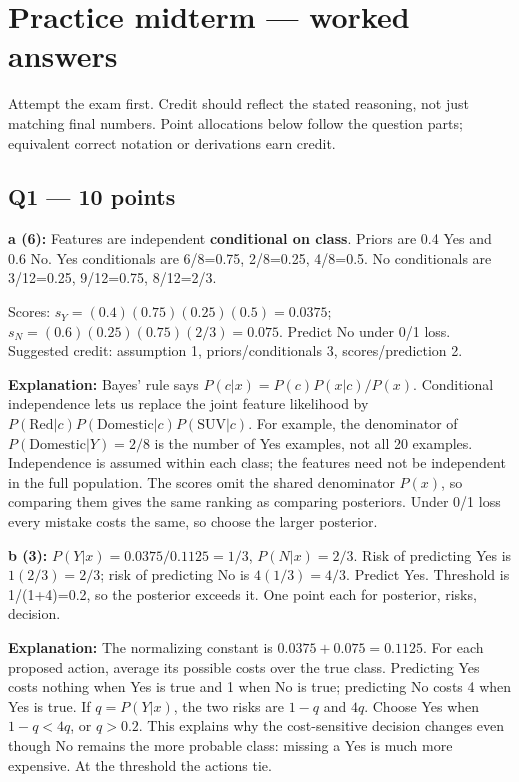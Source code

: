 \documentclass[11pt]{article}
\begin{document}
\section*{Practice midterm — worked answers}

Attempt the exam first. Credit should reflect the stated reasoning, not just matching final numbers. Point allocations below follow the question parts; equivalent correct notation or derivations earn credit.

\subsection*{Q1 — 10 points}

\textbf{a (6):} Features are independent \textbf{conditional on class}. Priors are 0.4 Yes and 0.6 No. Yes conditionals are 6/\allowbreak{}8=0.75, 2/\allowbreak{}8=0.25, 4/\allowbreak{}8=0.5. No conditionals are 3/\allowbreak{}12=0.25, 9/\allowbreak{}12=0.75, 8/\allowbreak{}12=2/\allowbreak{}3.

Scores: $s_Y=(0.4)(0.75)(0.25)(0.5)=0.0375$; $s_N=(0.6)(0.25)(0.75)(2/3)=0.075$. Predict No under 0/\allowbreak{}1 loss. Suggested credit: assumption 1, priors/\allowbreak{}conditionals 3, scores/\allowbreak{}prediction 2.

\textbf{Explanation:} Bayes' rule says $P(c|x)=P(c)P(x|c)/P(x)$. Conditional independence lets us replace the joint feature likelihood by $P(\mathrm{Red}|c)P(\mathrm{Domestic}|c)P(\mathrm{SUV}|c)$. For example, the denominator of $P(\mathrm{Domestic}|Y)=2/8$ is the number of Yes examples, not all 20 examples. Independence is assumed within each class; the features need not be independent in the full population. The scores omit the shared denominator $P(x)$, so comparing them gives the same ranking as comparing posteriors. Under 0/\allowbreak{}1 loss every mistake costs the same, so choose the larger posterior.

\textbf{b (3):} $P(Y|x)=0.0375/0.1125=1/3$, $P(N|x)=2/3$. Risk of predicting Yes is $1(2/3)=2/3$; risk of predicting No is $4(1/3)=4/3$. Predict Yes. Threshold is 1/\allowbreak{}(1+4)=0.2, so the posterior exceeds it. One point each for posterior, risks, decision.

\textbf{Explanation:} The normalizing constant is $0.0375+0.075=0.1125$. For each proposed action, average its possible costs over the true class. Predicting Yes costs nothing when Yes is true and 1 when No is true; predicting No costs 4 when Yes is true. If $q=P(Y|x)$, the two risks are $1-q$ and $4q$. Choose Yes when $1-q<4q$, or $q>0.2$. This explains why the cost-sensitive decision changes even though No remains the more probable class: missing a Yes is much more expensive. At the threshold the actions tie.
\end{document}
